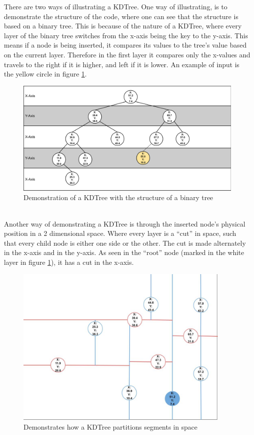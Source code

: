 There are two ways of illustrating a KDTree. One way of illustrating, is to demonstrate the structure of the code, where one can see that the structure is based on a binary tree. This is because of the nature of a KDTree, where every layer of the binary tree switches from the x-axis being the key to the y-axis. This means if a node is being inserted, it compares its values to the tree's value based on the current layer. Therefore in the first layer it compares only the x-values and travels to the right if it is higher, and left if it is lower. An example of input is the yellow circle in figure \ref{KDTree/structure}. 
\begin{figure}[ht]%
  \centering
  \includegraphics[width=12.5cm]{docs/material/KDTree structure.png}%
  \caption{\centering Demonstration of a KDTree with the structure of a binary tree }\label{KDTree/structure}%
\end{figure}\\
Another way of demonstrating a KDTree is through the inserted node's physical position in a 2 dimensional space. Where every layer is a “cut” in space, such that every child node is either one side or the other. The cut is made alternately in the x-axis and in the y-axis. As seen in the “root” node (marked in the white layer in figure \ref{KDTree/structure}), it has a cut in the x-axis.
\begin{figure}[ht]%
  \centering
  \includegraphics[width=10.5cm]{docs/material/KDTree Visuals.jpg}%
  \caption{\centering Demonstrates how a KDTree partitions segments in space }\label{KDTree/demo}%
\end{figure}\\
